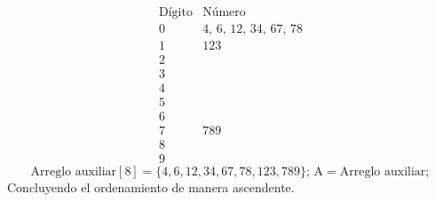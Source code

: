 \documentclass[letterpaper, 12pt]{article}
\begin{document}
    \[\begin{matrix}
        \text{Dígito}&\text{Número}\\
        0&4,\,6,\,12,\,34,\,67,\,78\\
        1&123\\
        2&\\
        3&\\
        4&\\
        5&\\
        6&\\
        7&789\\
        8&\\
        9&
    \end{matrix}\]
    \[\text{Arreglo auxiliar}[8]=\{4,6,12,34,67,78,123,789\};\,\text{A}=\text{Arreglo auxiliar};\]
    Concluyendo el ordenamiento de manera ascendente.
\end{document}
